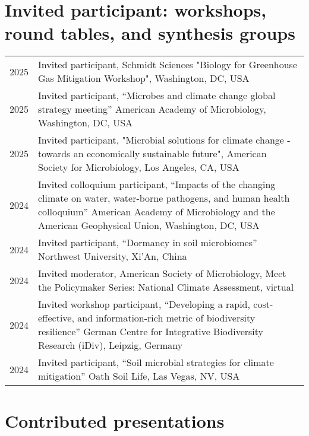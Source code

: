 \documentclass[11pt]{article}
\begin{document}
\section*{Invited participant: workshops, round tables, and synthesis groups}
\vspace{-1.25em} %
\noindent
\begin{longtable}{@{}p{2cm}@{\hspace{1em}}p{14cm}@{}}
2025 & Invited participant, Schmidt Sciences "Biology for Greenhouse Gas Mitigation Workshop", Washington, DC, USA\\

2025 & Invited participant, “Microbes and climate change global strategy meeting” American Academy of Microbiology, Washington, DC, USA \\

2025 & Invited participant, "Microbial solutions for climate change - towards an economically sustainable future", American Society for Microbiology, Los Angeles, CA, USA \\

2024 & Invited colloquium participant, “Impacts of the changing climate on water, water-borne pathogens, and human health colloquium” American Academy of Microbiology and the American Geophysical Union, Washington, DC, USA \\

2024 & Invited participant, “Dormancy in soil microbiomes” Northwest University, Xi’An, China \\

2024 & Invited moderator, American Society of Microbiology, Meet the Policymaker Series: National Climate Assessment, virtual \\

2024 & Invited workshop participant, “Developing a rapid, cost-effective, and information-rich metric of biodiversity resilience” German Centre for Integrative Biodiversity Research (iDiv), Leipzig, Germany \\

2024 & Invited participant, “Soil microbial strategies for climate mitigation” Oath Soil Life, Las Vegas, NV, USA \\
\end{longtable}

\section*{Contributed presentations}
\vspace{-0.5em}
\end{document}
